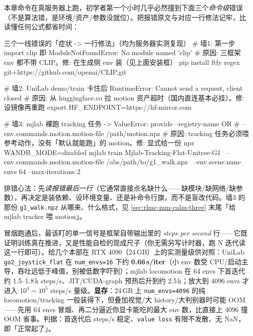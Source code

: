 \begin{pitfall}
本章命令在真服务器上跑，初学者第一个小时几乎必然撞到下面三个\emph{命令级}错误（不是算法错，是环境/资产/参数没就位）。把报错原文与对应一行修法记牢，比读懂任何公式都省时间：

\begin{codebox}[bash]{三个一线错误的「症状 -> 一行修法」（均为服务器实测复现）}
# 墙1: 第一步 import clip 即 ModuleNotFoundError: No module named 'clip'
#   原因: 三框架 env 都不带 CLIP。修: 在生成侧 env 装（见上面安装框）
pip install ftfy regex git+https://github.com/openai/CLIP.git

# 墙2: UniLab demo/train 卡住后 RuntimeError: Cannot send a request, client closed
#   原因: 从 huggingface.co 拉 motion 资产超时（国内直连基本必挂）。修: 设镜像再重跑
export HF_ENDPOINT=https://hf-mirror.com

# 墙3: mjlab 裸跑 tracking 任务 -> ValueError: provide --registry-name OR
#       --env.commands.motion.motion-file /path/motion.npz
#   原因: tracking 任务必须喂参考动作，没有「默认就能跑」的 motion。修: 显式给一份 npz
WANDB_MODE=disabled mjlab train Mjlab-Tracking-Flat-Unitree-G1 \
    --env.commands.motion.motion-file /abs/path/to/g1_walk.npz \
    --env.scene.num-envs 64 --max-iterations 2
\end{codebox}

\noindent 排错心法：先\emph{读报错最后一行}（它通常直接点名缺什么——缺模块/缺网络/缺参数），再决定是装依赖、设环境变量、还是补命令行旗，而不是盲改代码。墙3 的那份 \verb|g1_walk.npz| 从哪来、什么格式，见 \cref{sec:rlmc-mm-calm-three} 末尾「给 mjlab tracker 喂 motion」。
\end{pitfall}

\begin{note}
冒烟跑通后，最该盯的单一信号是框架自带输出里的 \emph{steps per second} 行——它既证明训练真在推进，又是性能自检的现成尺子（你无需另写计时器，跑 N 迭代读这一行即可）。给几个本部在 RTX 4090（24\,GB）上的实测量级供对照：UniLab \verb|go2_joystick_flat| 在 \verb|num_envs=16| 下约 \textbf{0.66\,s/iter}（小 env 数受 CPU/启动主导，吞吐远低于峰值，别被低数字吓到）；mjlab locomotion 在 64 envs 下首迭代约 1.5--1.8\,k steps/s、JIT/CUDA-graph 预热后升到约 2.5\,k；放大到 4096 envs 才进入 $10^4\sim10^5$ steps/s 量级。\textbf{显存}：24\,GB 上 \verb|num_envs=4096| 的纯 locomotion/tracking 一般装得下，但叠加视觉/大 history/大判别器时可能 OOM——先用 64 envs 冒烟、再二分逼近你显卡能吃的最大 env 数，比直接上 4096 撞 OOM 省事。判据：首迭代后 steps/s 稳定、\verb|value loss| 有限不发散、无 NaN，即「正常起了」。
\end{note}

